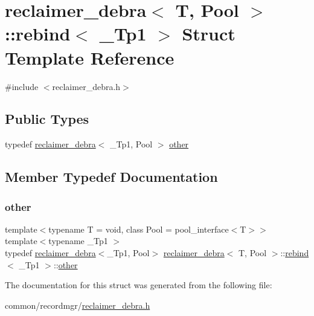 \hypertarget{structreclaimer__debra_1_1rebind}{}\section{reclaimer\+\_\+debra$<$ T, Pool $>$\+:\+:rebind$<$ \+\_\+\+Tp1 $>$ Struct Template Reference}
\label{structreclaimer__debra_1_1rebind}


{\ttfamily \#include $<$reclaimer\+\_\+debra.\+h$>$}

\subsection*{Public Types}
\begin{DoxyCompactItemize}
\item 
typedef \hyperlink{classreclaimer__debra}{reclaimer\+\_\+debra}$<$ \+\_\+\+Tp1, Pool $>$ \hyperlink{structreclaimer__debra_1_1rebind_aedfd972a0cbcdcce872891f66f32d429}{other}
\end{DoxyCompactItemize}


\subsection{Member Typedef Documentation}
\mbox{\label{structreclaimer__debra_1_1rebind_aedfd972a0cbcdcce872891f66f32d429}} 
\subsubsection{\texorpdfstring{other}{other}}
{\footnotesize\ttfamily template$<$typename T  = void, class Pool  = pool\+\_\+interface$<$\+T$>$$>$ \\
template$<$typename \+\_\+\+Tp1 $>$ \\
typedef \hyperlink{classreclaimer__debra}{reclaimer\+\_\+debra}$<$\+\_\+\+Tp1, Pool$>$ \hyperlink{classreclaimer__debra}{reclaimer\+\_\+debra}$<$ T, Pool $>$\+::\hyperlink{structreclaimer__debra_1_1rebind}{rebind}$<$ \+\_\+\+Tp1 $>$\+::\hyperlink{structreclaimer__debra_1_1rebind_aedfd972a0cbcdcce872891f66f32d429}{other}}



The documentation for this struct was generated from the following file\+:\begin{DoxyCompactItemize}
\item 
common/recordmgr/\hyperlink{reclaimer__debra_8h}{reclaimer\+\_\+debra.\+h}\end{DoxyCompactItemize}
